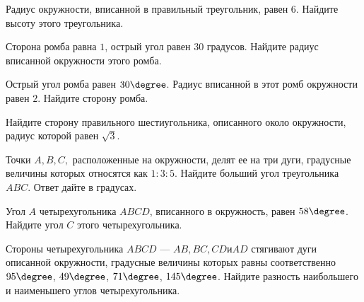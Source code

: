 \begin{class}[number=8]
\begin{listofex}
		\item Радиус окружности, вписанной в правильный треугольник, равен \(6\). Найдите высоту этого треугольника.
		\item Сторона ромба равна \(1\), острый угол равен \(30\) градусов. Найдите радиус вписанной окружности этого ромба.
		\item Острый угол ромба равен \(30\degree \). Радиус вписанной в этот ромб окружности равен \(2\). Найдите сторону ромба.
		\item Найдите сторону правильного шестиугольника, описанного около окружности, радиус которой равен \(\sqrt{3}\).
		
		\item Точки \(A, B, C,\) расположенные на окружности, делят ее на три дуги, градусные величины которых относятся как \(1 : 3 : 5\). Найдите больший угол треугольника \(ABC\). Ответ дайте в градусах.
		\item Угол \(A\) четырехугольника \(ABCD\), вписанного в окружность, равен \(58 \degree \). Найдите угол \(C\) этого четырехугольника.
		\item Стороны четырехугольника \(ABCD\) --- \(AB, BC, CD и AD\) стягивают дуги описанной окружности, градусные величины которых равны соответственно \(95\degree \), \(49\degree\), \(71\degree\), \(145\degree\). Найдите разность наибольшего и наименьшего углов четырехугольника.
	\end{listofex}
\end{class}
